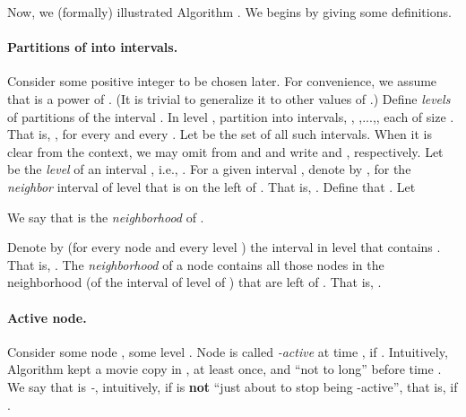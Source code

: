 \documentclass[11pt]{article}
\begin{document}
Now, we (formally) illustrated Algorithm . We begins by giving some definitions.










\paragraph*{\bf Partitions of  into intervals\commsingle.\commsingleend}
Consider some positive integer  to be chosen later.
For convenience, we assume that  is a power of .
(It is trivial to generalize it to other values of .)
Define  {\em levels} of partitions of the interval .
In level , partition  into  intervals,
, ,...,, each of size .
That is,
,
for every  and every .
Let  be the set of all such intervals.
When it is clear from the context, we may omit  from  and  and write  and , respectively.
Let  be the {\em level} of an interval , i.e., .
For a given interval ,
denote by , for  the {\em neighbor} interval of level  that is on the left of .
That is, . Define that . Let

We say that  is the {\em neighborhood } of .



Denote by  (for every node  and every level ) the  interval in level  that contains .
That is,
.
The {\em neighborhood}  of a node  contains all those nodes in the neighborhood 
(of the interval of level  of ) that are left of .
That is, .


\vspace{-0.3cm}
\paragraph*{\bf Active node\commsingle.\commsingleend}
\label{subsection: def delta active intervals}
Consider some node , some level .
Node  is called {\em -active} at time ,
if
.
Intuitively,  Algorithm 
kept a movie copy in , at least once, and ``not to long'' before time .
We say that
 is {\em -}, intuitively, if  is {\bf not} ``just about to stop being -active'',
that is, if .
\end{document}
